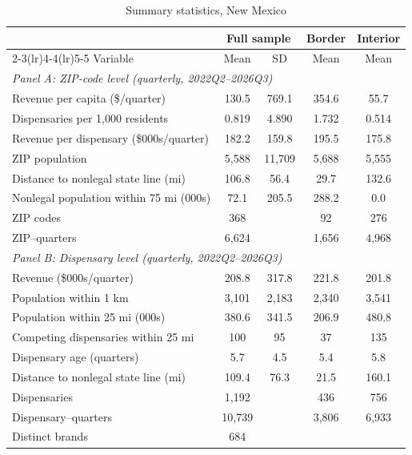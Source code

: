 \begin{table}[htbp]
\centering
\caption{Summary statistics, New Mexico}
\label{tab:sumstats_nm}
\footnotesize
\begin{tabular}{lcccc}
\toprule
 & \multicolumn{2}{c}{Full sample} & Border & Interior \\
\cmidrule(lr){2-3}\cmidrule(lr){4-4}\cmidrule(lr){5-5}
Variable & Mean & SD & Mean & Mean \\
\midrule
\multicolumn{5}{l}{\textit{Panel A: ZIP-code level (quarterly, 2022Q2--2026Q3)}} \\
Revenue per capita (\$/quarter) & 130.5 & 769.1 & 354.6 & 55.7 \\
Dispensaries per 1,000 residents & 0.819 & 4.890 & 1.732 & 0.514 \\
Revenue per dispensary (\$000s/quarter) & 182.2 & 159.8 & 195.5 & 175.8 \\
ZIP population & 5,588 & 11,709 & 5,688 & 5,555 \\
Distance to nonlegal state line (mi) & 106.8 & 56.4 & 29.7 & 132.6 \\
Nonlegal population within 75 mi (000s) & 72.1 & 205.5 & 288.2 & 0.0 \\
\addlinespace
ZIP codes & 368 & & 92 & 276 \\
ZIP--quarters & 6,624 & & 1,656 & 4,968 \\
\midrule
\multicolumn{5}{l}{\textit{Panel B: Dispensary level (quarterly, 2022Q2--2026Q3)}} \\
Revenue (\$000s/quarter) & 208.8 & 317.8 & 221.8 & 201.8 \\
Population within 1 km & 3,101 & 2,183 & 2,340 & 3,541 \\
Population within 25 mi (000s) & 380.6 & 341.5 & 206.9 & 480.8 \\
Competing dispensaries within 25 mi & 100 & 95 & 37 & 135 \\
Dispensary age (quarters) & 5.7 & 4.5 & 5.4 & 5.8 \\
Distance to nonlegal state line (mi) & 109.4 & 76.3 & 21.5 & 160.1 \\
\addlinespace
Dispensaries & 1,192 & & 436 & 756 \\
Dispensary--quarters & 10,739 & & 3,806 & 6,933 \\
Distinct brands & 684 & & & \\
\bottomrule
\end{tabular}
\begin{minipage}{0.92\textwidth}
\vspace{0.4em}\footnotesize

\end{minipage}
\end{table}
